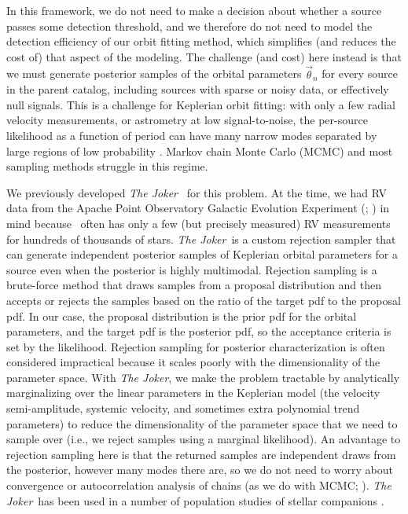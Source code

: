 \documentclass[twocolumn]{AASTeX7/aastex701}
\newcommand{\joker}{\textsl{The Joker}}
\begin{document}
In this framework, we do not need to make a decision about whether a source passes some
detection threshold, and we therefore do not need to model the detection efficiency of
our orbit fitting method, which simplifies (and reduces the cost of) that aspect of the
modeling.
The challenge (and cost) here instead is that we must generate posterior samples of the
orbital parameters $\vec{\theta}_n$ for every source in the parent catalog, including
sources with sparse or noisy data, or effectively null signals.
This is a challenge for Keplerian orbit fitting: with only a few radial velocity
measurements, or astrometry at low signal-to-noise, the per-source likelihood as a
function of period can have many narrow modes separated by large regions of low
probability \citep[e.g.,][]{Price-Whelan:2017}.
Markov chain Monte Carlo (MCMC) and most sampling methods struggle in this regime.

We previously developed \joker\ \citep{Price-Whelan:2017} for this problem.
At the time, we had RV data from the Apache Point Observatory Galactic Evolution
Experiment (\apogee; \citealt{Majewski:2017}) in mind because \apogee\ often has only a
few (but precisely measured) RV measurements for hundreds of thousands of stars.
\joker\ is a custom rejection sampler that can generate independent posterior samples of
Keplerian orbital parameters for a source even when the posterior is highly multimodal.
Rejection sampling is a brute-force method that draws samples from a proposal
distribution and then accepts or rejects the samples based on the ratio of the target
pdf to the proposal pdf.
In our case, the proposal distribution is the prior pdf for the orbital parameters, and
the target pdf is the posterior pdf, so the acceptance criteria is set by the
likelihood.
Rejection sampling for posterior characterization is often considered impractical
because it scales poorly with the dimensionality of the parameter space.
With \joker, we make the problem tractable by analytically marginalizing over the linear
parameters in the Keplerian model (the velocity semi-amplitude, systemic velocity, and
sometimes extra polynomial trend parameters) to reduce the dimensionality of the
parameter space that we need to sample over (i.e., we reject samples using a marginal
likelihood).
An advantage to rejection sampling here is that the returned samples are independent
draws from the posterior, however many modes there are, so we do not need to worry about
convergence or autocorrelation analysis of chains (as we do with MCMC;
\citealt{Hogg:2018}).
\joker\ has been used in a number of population studies of stellar companions
\citep[e.g.,][]{Giesers:2019, Price-Whelan:2020, Rosenthal:2021}.
\end{document}
